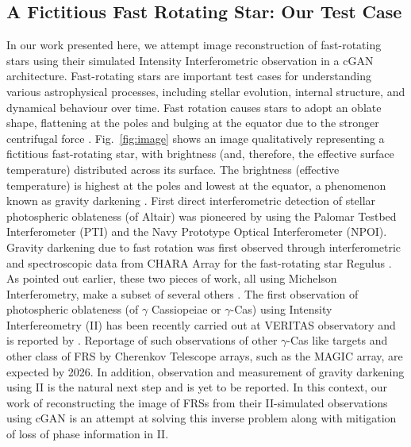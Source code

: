 \subsection{A Fictitious Fast Rotating Star: Our Test Case}
In our work presented here, we attempt image reconstruction of fast-rotating stars using their simulated Intensity Interferometric observation in a cGAN architecture. Fast-rotating stars are important test cases for understanding various astrophysical processes, including stellar evolution, internal structure, and dynamical behaviour over time. Fast rotation causes stars to adopt an oblate shape, flattening at the poles and bulging at the equator due to the stronger centrifugal force \citep[e.g.,][]{von1924radiative, 1999A&A...347..185M}. Fig.~\ref{fig:image} shows an image qualitatively representing a fictitious fast-rotating star, with brightness (and, therefore, the effective surface temperature) distributed across its surface. The brightness (effective temperature) is highest at the poles and lowest at the equator, a phenomenon known as gravity darkening \citep{lucy1967gravity}. First direct interferometric detection of stellar photospheric oblateness (of Altair) was pioneered by \cite{vanBelle2001} using the Palomar Testbed Interferometer (PTI) and the Navy Prototype Optical Interferometer (NPOI). Gravity darkening due to fast rotation was first observed through interferometric and spectroscopic data from CHARA Array for the fast-rotating star Regulus \citep{mcalister2005first}.  As pointed out earlier, these two pieces  of work, all using Michelson Interferometry, make a subset of several others \citep{vanBelle2001, DomicianodeSouza2003, mcalister2005first, DomicianodeSouza2005, Monnier2007, Pedretti2009, Zhao2009, Martinez2021}. The first observation of photospheric oblateness (of $\gamma$ Cassiopeiae or $\gamma$-Cas) using Intensity Interfereometry (II) has been recently carried out at VERITAS observatory and is reported by \cite{Archer-arXiv-2025}. Reportage of such observations of other $\gamma$-Cas like targets and other class of FRS by Cherenkov Telescope arrays, such as  the MAGIC array, are expected by 2026. In addition, observation and measurement of gravity darkening using II is the natural next step and is yet to be reported. In this context, our work of reconstructing the image of FRSs from their II-simulated observations using cGAN is an attempt at solving this inverse problem along with mitigation of loss of phase information in II. 

